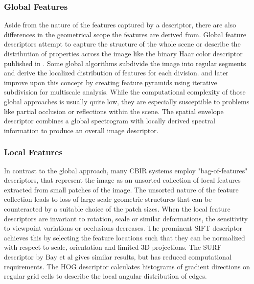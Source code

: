\subsubsection{Global Features}

Aside from the nature of the features captured by a descriptor, there are also
differences in the geometrical scope the features are derived from. Global
feature descriptors attempt to capture the structure of the whole scene or
describe the distribution of properties across the image like the binary Haar
color descriptor published in \autocite{utenpattanant_color_2006}. Some global
algorithms subdivide the image into regular segments and derive the localized
distribution of features for each division. \autocite{lazebnik_beyond_2006} and
later \autocite{lazebnik_spatial_2009} improve upon this concept by creating
feature pyramids using iterative subdivision for multiscale analysis. While the
computational complexity of those global approaches is usually quite low, they
are especially susceptible to problems like partial occlusion or reflections
within the scene. The spatial envelope descriptor
\autocite{oliva_modeling_2001} combines a global spectrogram with locally
derived spectral information to produce an overall image descriptor.

\subsubsection{Local Features}

In contrast to the global approach, many CBIR systems employ "bag-of-features"
descriptors, that represent the image as an unsorted collection of local
features extracted from small patches of the image. The unsorted nature of the
feature collection leads to loss of large-scale geometric structures that can
be counteracted by a suitable choice of the patch sizes. When the local feature
descriptors are invariant to rotation, scale or similar deformations, the
sensitivity to viewpoint variations or occlusions decreases. The prominent SIFT
descriptor \autocite{lowe_object_1999} achieves this by selecting the feature
locations such that they can be normalized with respect to scale, orientation
and limited 3D projections. The SURF descriptor by Bay et al
\autocite{bay_speeded-up_2008} gives similar results, but has reduced
computational requirements. The HOG descriptor \autocite{dalal_histograms_2005}
calculates histograms of gradient directions on regular grid cells to describe
the local angular distribution of edges.

